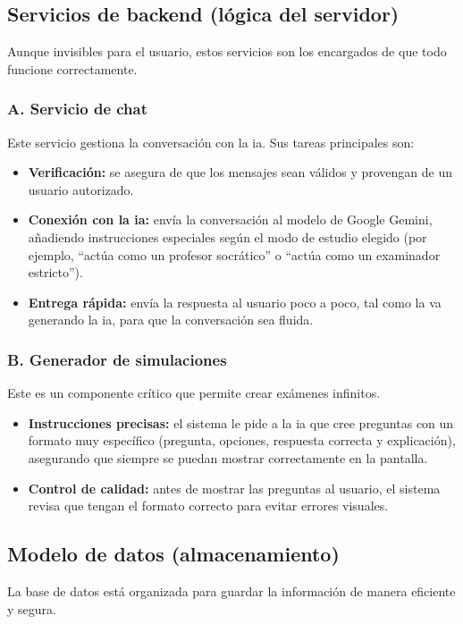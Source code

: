 \subsection{Servicios de backend (lógica del servidor)}
Aunque invisibles para el usuario, estos servicios son los encargados de que todo funcione correctamente.

\subsubsection{A. Servicio de chat}
Este servicio gestiona la conversación con la \gls{ia}. Sus tareas principales son:
\begin{itemize}
\item \textbf{Verificación:} se asegura de que los mensajes sean válidos y provengan de un usuario autorizado.
\item \textbf{Conexión con la \gls{ia}:} envía la conversación al modelo de Google Gemini, añadiendo instrucciones especiales según el modo de estudio elegido (por ejemplo, \enquote{actúa como un profesor socrático} o \enquote{actúa como un examinador estricto}).
\item \textbf{Entrega rápida:} envía la respuesta al usuario poco a poco, tal como la va generando la \gls{ia}, para que la conversación sea fluida.
\end{itemize}

\subsubsection{B. Generador de simulaciones}
Este es un componente crítico que permite crear exámenes infinitos.
\begin{itemize}
\item \textbf{Instrucciones precisas:} el sistema le pide a la \gls{ia} que cree preguntas con un formato muy específico (pregunta, opciones, respuesta correcta y explicación), asegurando que siempre se puedan mostrar correctamente en la pantalla.
\item \textbf{Control de calidad:} antes de mostrar las preguntas al usuario, el sistema revisa que tengan el formato correcto para evitar errores visuales.
\end{itemize}

\subsection{Modelo de datos (almacenamiento)}
La base de datos está organizada para guardar la información de manera eficiente y segura.

